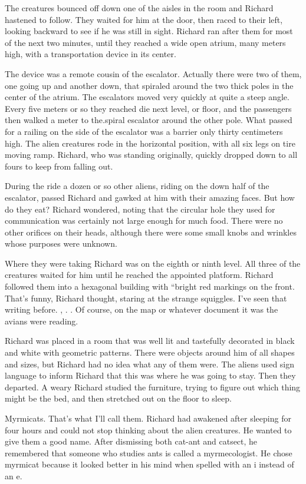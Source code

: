 \documentclass[]{article}
\begin{document}
{The creatures bounced off down one of the aisles in the room and Richard hastened to follow.  They waited for him at the door, then raced to their left, looking backward to see if he was still in sight.  Richard ran after them for most of the next two minutes, until they reached a wide open atrium, many meters high, with a transportation device in its center.

The device was a remote cousin of the escalator.  Actually there were two of them, one going up and another down, that spiraled around the two thick poles in the center of the atrium.  The escalators moved very quickly at quite a steep angle.  Every five meters or so they reached die next level, or floor, and the passengers then walked a meter to the.spiral escalator around the other pole.  What passed for a railing on the side of the escalator was a barrier only thirty centimeters high.  The alien creatures rode in the horizontal position, with all six legs on tire moving ramp.  Richard, who was standing originally, quickly dropped down to all fours to keep from falling out.

During the ride a dozen or so other aliens, riding on the down half of the escalator, passed Richard and gawked at him with their amazing faces.  But how do they eat? Richard wondered, noting that the circular hole they used for communication was certainly not large enough for much food.  There were no other orifices on their heads, although there were some small knobs and wrinkles whose purposes were unknown.

Where they were taking Richard was on the eighth or ninth level.  All three of the creatures waited for him until he reached the appointed platform.  Richard followed them into a hexagonal building with “bright red markings on the front.  That’s funny, Richard thought, staring at the strange squiggles.  I’ve seen that writing before.  , .  .  Of course, on the map or whatever document it was the avians were reading.

Richard was placed in a room that was well lit and tastefully decorated in black and white with geometric patterns.  There were objects around him of all shapes and sizes, but Richard had no idea what any of them were.  The aliens used sign language to inform Richard that this was where he was going to stay.  Then they departed.  A weary Richard studied the furniture, trying to figure out which thing might be the bed, and then stretched out on the floor to sleep.

Myrmicats.  That’s what I’ll call them.  Richard had awakened after sleeping for four hours and could not stop thinking about the alien creatures.  He wanted to give them a good name.  After dismissing both cat-ant and catsect, he remembered that someone who studies ants is called a myrmecologist.  He chose myrmicat because it looked better in his mind when spelled with an i instead of an e.

}
\end{document}
